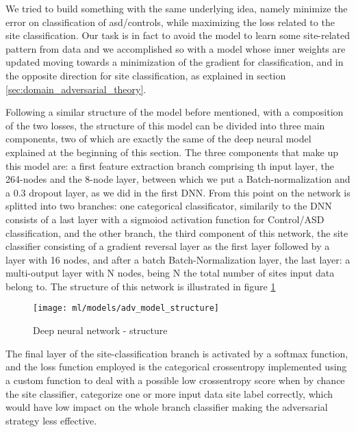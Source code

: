 \documentclass[a4paper,11pt]{article}
\begin{document}
We tried to build something with the same underlying idea, namely minimize the error on classification of asd/controls, while maximizing the loss related to the site classification.
Our task is in fact to avoid the model to learn some site-related pattern from data and we accomplished so with a model whose inner weights are updated moving towards a minimization of the gradient for classification, and in the opposite direction for site classification, as explained in section \ref{sec:domain_adversarial_theory}.

Following a similar structure of the model before mentioned, with a composition of the two losses, the structure of this model can be divided into three main components, two of which are exactly the same of the deep neural model explained at the beginning of this section.
The three components that make up this model are: a first feature extraction branch comprising th input layer, the 264-nodes and the 8-node layer, between which we put a Batch-normalization and a 0.3 dropout layer, as we did in the first DNN.
From this point on the network is splitted into two branches: one categorical classificator, similarily to the DNN consists of a last layer with a sigmoiod activation function for Control/ASD classification,
and the other branch, the third component of this network, the site classifier consisting of a gradient reversal layer as the first layer followed by a layer with 16 nodes, and after a batch Batch-Normalization layer, the last layer: a multi-output layer with N nodes, being N the total number of sites input data belong to.
The structure of this network is illustrated in figure \ref{fig:adv_model_structure}


\begin{figure}[h!]
\centering
\texttt{[image: ml/models/adv\_model\_structure]}
\caption{Deep neural network - structure}
\label{fig:adv_model_structure}
\end{figure}



The final layer of the site-classification branch is activated by a softmax function, and the loss function employed is the categorical crossentropy implemented using a custom function to deal with a possible low crossentropy score when by chance the site classifier, categorize one or more input data site label correctly, which would have low impact on the whole branch classifier making the adversarial strategy less effective.
\end{document}
